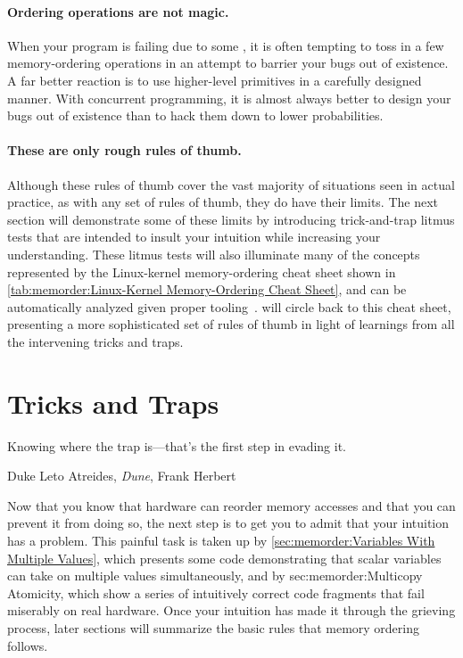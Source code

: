 \paragraph{Ordering operations are not magic.}
When your program is failing due to some , it is often
tempting to toss in a few memory-ordering operations in an attempt
to barrier your bugs out of existence.
A far better reaction is to use higher-level primitives in a carefully
designed manner.
With concurrent programming, it is almost always better to design your
bugs out of existence than to hack them down to lower probabilities.

\paragraph{These are only rough rules of thumb.}
Although these rules of thumb cover the vast majority of situations
seen in actual practice, as with any set of rules of thumb, they
do have their limits.
The next section will demonstrate some of these limits by introducing
trick-and-trap litmus tests that are intended to insult your
intuition while increasing your understanding.
These litmus tests will also illuminate many of the concepts
represented by the Linux-kernel memory-ordering cheat sheet shown in
\cref{tab:memorder:Linux-Kernel Memory-Ordering Cheat Sheet},
and can be automatically analyzed given proper
tooling~\cite{Alglave:2018:FSC:3173162.3177156}.
 will
circle back to this cheat sheet, presenting a more sophisticated set of
rules of thumb in light of learnings from all the intervening tricks
and traps.

\QuickQuizEnd

\section{Tricks and Traps}
\label{sec:memorder:Tricks and Traps}
%
\epigraph{Knowing where the trap is---that's the first step in evading it.}
	 {Duke Leto Atreides, \emph{Dune}, Frank Herbert}

Now that you know that hardware can reorder memory accesses and that you
can prevent it from doing so, the next step is to get you to admit
that your intuition has a problem.
This painful task is taken up by
\cref{sec:memorder:Variables With Multiple Values},
which presents some code demonstrating that scalar variables can
take on multiple values simultaneously,
and by
{sec:memorder:Multicopy Atomicity},
which show a series of intuitively correct code fragments that fail miserably
on real hardware.
Once your intuition has made it through the grieving process, later
sections will summarize the basic rules that memory ordering follows.

